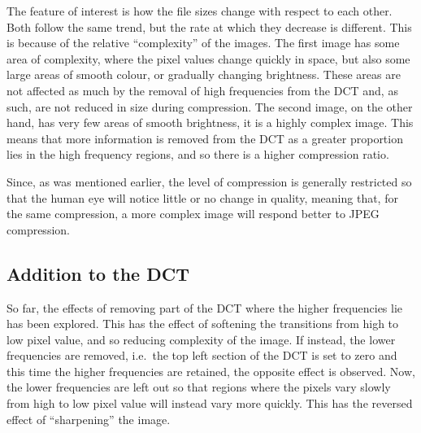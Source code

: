 		The feature of interest is how the file sizes change with respect to each other. Both follow the same trend, but the rate at which they decrease is different. This is because of the relative ``complexity'' of the images. The first image has some area of complexity, where the pixel values change quickly in space, but also some large areas of smooth colour, or gradually changing brightness. These areas are not affected as much by the removal of high frequencies from the DCT and, as such, are not reduced in size during compression. The second image, on the other hand, has very few areas of smooth brightness, it is a highly complex image. This means that more information is removed from the DCT as a greater proportion lies in the high frequency regions, and so there is a higher compression ratio.

		Since, as was mentioned earlier, the level of compression is generally restricted so that the human eye will notice little or no change in quality, meaning that, for the same compression, a more complex image will respond better to JPEG compression.

	\subsection{Addition to the DCT} %
		\label{sub:addition_to_the_dct}
		So far, the effects of removing part of the DCT where the higher frequencies lie has been explored. This has the effect of softening the transitions from high to low pixel value, and so reducing complexity of the image. If instead, the lower frequencies are removed, i.e.\ the top left section of the DCT is set to zero and this time the higher frequencies are retained, the opposite effect is observed. Now, the lower frequencies are left out so that regions where the pixels vary slowly from high to low pixel value will instead vary more quickly. This has the reversed effect of ``sharpening'' the image.

